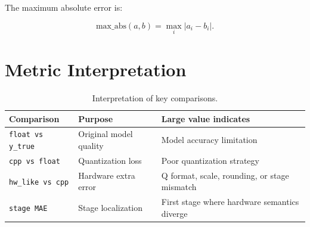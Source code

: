 The maximum absolute error is:

\begin{equation}
  \mathrm{max\_abs}(a,b) = \max_i |a_i - b_i|.
\end{equation}

\section{Metric Interpretation}

\begin{table}[h]
\centering
\caption{Interpretation of key comparisons.}
\label{tab:metric-meaning}
\begin{tabular}{lll}
\toprule
Comparison & Purpose & Large value indicates \\
\midrule
\texttt{float vs y\_true} & Original model quality & Model accuracy limitation \\
\texttt{cpp vs float} & Quantization loss & Poor quantization strategy \\
\texttt{hw\_like vs cpp} & Hardware extra error & Q format, scale, rounding, or stage mismatch \\
\texttt{stage MAE} & Stage localization & First stage where hardware semantics diverge \\
\bottomrule
\end{tabular}
\end{table}

